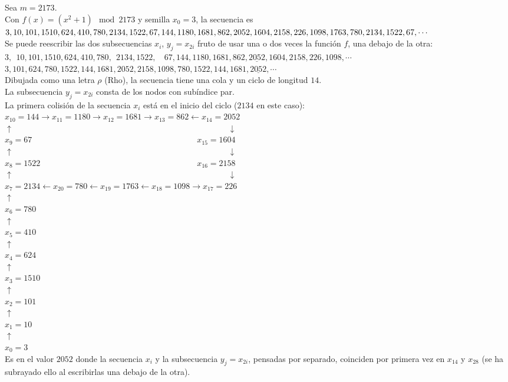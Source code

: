 \begin{ejemplo}
Sea $m=2173$. \\
Con $f(x) = (x^2 + 1) \mod 2173$ y semilla $x_0=3$, la secuencia es \\
$3, 10, 101, 1510, 624, 410, 780, 2134, 1522, 67, 144, 1180, 1681, 862, 2052, 1604, 2158, 226, 1098, \\
1763, 780, 2134, 1522, 67, \cdots $ \\
Se puede reescribir las dos subsecuencias $x_i$, $y_j=x_{2i}$ fruto de usar una o dos veces la función $f$, una debajo de la otra: \\
$3, \, \; 10, 101, 1510, 624, 410, 780, \, \; 2134, 1522, \,\,\,\,\;67, 144, 1180, 1681, 862, \underline{2052}, 1604, 2158, 226, 1098, \cdots$ \\
$3, 101, 624, 780, 1522, 144, 1681, 2052, 2158, 1098, 780, 1522, 144, 1681, \underline{2052}, \cdots$ \\
Dibujada como una letra $\rho$ (Rho), la secuencia tiene una cola y un ciclo de longitud $14$. \\
La subsecuencia $y_j=x_{2i}$ consta de los nodos con subíndice par. \\
La primera colisión de la secuencia $x_i$ está en el inicio del ciclo ($2134$ en este caso): \\
$x_{10}=144 \rightarrow x_{11}=1180 \rightarrow x_{12}=1681 \rightarrow x_{13}=862 \leftarrow x_{14}=2052$ \\
$\uparrow \qquad\qquad\qquad\qquad\qquad\qquad\qquad\qquad\qquad\qquad\qquad\qquad\qquad \downarrow$ \\
$x_9=67 \qquad\qquad\qquad\qquad\qquad\qquad\qquad\qquad\qquad\qquad x_{15}=1604$ \\
$\uparrow \qquad\qquad\qquad\qquad\qquad\qquad\qquad\qquad\qquad\qquad\qquad\qquad\qquad \downarrow$ \\
$x_8=1522  \qquad\qquad\qquad\qquad\qquad\qquad\qquad\qquad\qquad\quad x_{16}=2158$ \\
$\uparrow \qquad\qquad\qquad\qquad\qquad\qquad\qquad\qquad\qquad\qquad\qquad\qquad\qquad \downarrow$ \\
$x_7=2134 \leftarrow x_{20}=780 \leftarrow x_{19}=1763 \leftarrow x_{18}=1098 \rightarrow x_{17}=226$ \\
$\uparrow$ \\
$x_6=780$ \\
$\uparrow$ \\
$x_5=410$ \\
$\uparrow$ \\
$x_4=624$ \\
$\uparrow$ \\
$x_3=1510$ \\
$\uparrow$ \\
$x_2=101$ \\
$\uparrow$ \\
$x_1=10$ \\
$\uparrow$ \\
$x_0=3$ \\
Es en el valor $2052$ donde la secuencia $x_i$ y la subsecuencia $y_j=x_{2i}$, pensadas por separado, coinciden por primera vez en $x_{14}$ y $x_{28}$ (se ha subrayado ello al escribirlas una debajo de la otra).
\end{ejemplo}


